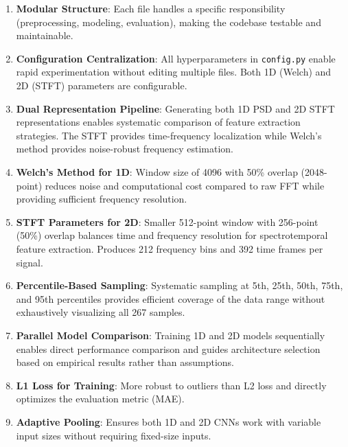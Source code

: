 \begin{enumerate}
    \item \textbf{Modular Structure}: Each file handles a specific responsibility (preprocessing, modeling, evaluation),
    making the codebase testable and maintainable.
    
    \item \textbf{Configuration Centralization}: All hyperparameters in \verb|config.py| enable rapid experimentation 
    without editing multiple files. Both 1D (Welch) and 2D (STFT) parameters are configurable.
    
    \item \textbf{Dual Representation Pipeline}: Generating both 1D PSD and 2D STFT representations enables systematic 
    comparison of feature extraction strategies. The STFT provides time-frequency localization while Welch's method provides 
    noise-robust frequency estimation.
    
    \item \textbf{Welch's Method for 1D}: Window size of 4096 with 50\% overlap (2048-point) reduces noise and computational 
    cost compared to raw FFT while providing sufficient frequency resolution.
    
    \item \textbf{STFT Parameters for 2D}: Smaller 512-point window with 256-point (50\%) overlap balances time and frequency 
    resolution for spectrotemporal feature extraction. Produces 212 frequency bins and 392 time frames per signal.
    
    \item \textbf{Percentile-Based Sampling}: Systematic sampling at 5th, 25th, 50th, 75th, and 95th percentiles provides 
    efficient coverage of the data range without exhaustively visualizing all 267 samples.
    
    \item \textbf{Parallel Model Comparison}: Training 1D and 2D models sequentially enables direct performance comparison 
    and guides architecture selection based on empirical results rather than assumptions.
    
    \item \textbf{L1 Loss for Training}: More robust to outliers than L2 loss and directly optimizes the evaluation metric (MAE).
    
    \item \textbf{Adaptive Pooling}: Ensures both 1D and 2D CNNs work with variable input sizes without requiring fixed-size inputs.
    

\end{enumerate}
